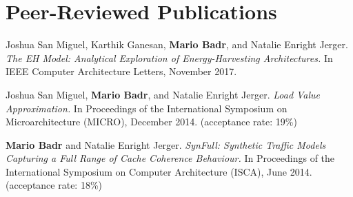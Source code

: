 \section{\sc Peer-Reviewed Publications}

\begin{samepage}
  Joshua San Miguel, Karthik Ganesan, \textbf{Mario Badr}, and Natalie Enright Jerger.
  \textit{The EH Model: Analytical Exploration of Energy-Harvesting Architectures.}
  In IEEE Computer Architecture Letters, November 2017.
\end{samepage}

\begin{samepage}
  Joshua San Miguel, \textbf{Mario Badr}, and Natalie Enright Jerger.
  \textit{Load Value Approximation.}
  In Proceedings of the International Symposium on Microarchitecture (MICRO), December 2014.
  (acceptance rate: 19\%)
\end{samepage}

\begin{samepage}
  \textbf{Mario Badr} and Natalie Enright Jerger.
  \textit{SynFull: Synthetic Traffic Models Capturing a Full Range of Cache Coherence Behaviour.}
  In Proceedings of the International Symposium on Computer Architecture (ISCA), June 2014.
  (acceptance rate: 18\%)
\end{samepage}
